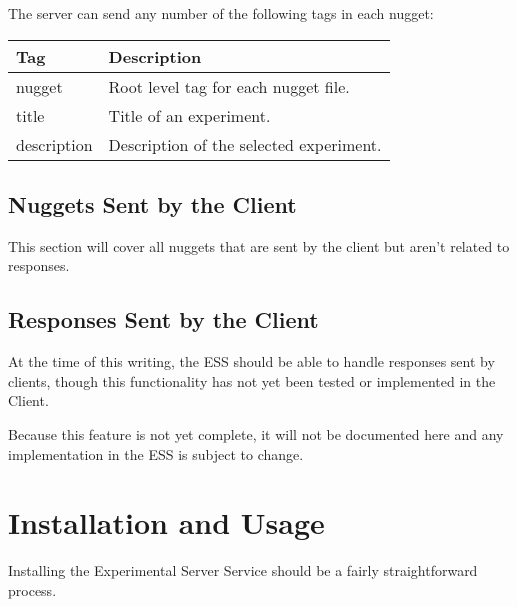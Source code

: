 \documentclass[letterpaper]{article}
\begin{document}
The server can send any number of the following tags in each nugget:

\begin{tabular}{|l|l|}
\hline
\textbf{Tag} & \textbf{Description}\\
\hline
\hline
nugget & Root level tag for each nugget file.\\
\hline
title & Title of an experiment.\\
\hline
description & Description of the selected experiment. 
\end{tabular}

\subsection{Nuggets Sent by the Client}
This section will cover all nuggets that are sent by the client but aren't related to responses.

\subsection{Responses Sent by the Client}
At the time of this writing, the ESS should be able to handle responses sent by clients, though this functionality has not yet been tested or implemented in the Client.

Because this feature is not yet complete, it will not be documented here and any implementation in the ESS is subject to change. 

\section{Installation and Usage}
Installing the Experimental Server Service should be a fairly straightforward process. 
\end{document}
